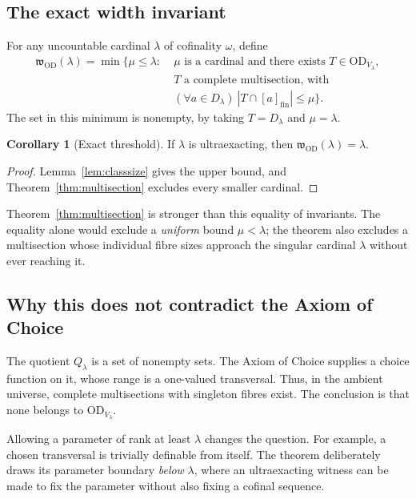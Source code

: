 \documentclass[11pt,letterpaper]{article}
\theoremstyle{definition}
\newtheorem{corollary}[definition]{Corollary}
\numberwithin{equation}{section}
\newcommand{\OD}{\mathrm{OD}}
\newcommand{\cl}[1]{[#1]_{\mathrm{fin}}}
\newcommand{\wOD}{\mathfrak w_{\OD}}
\begin{document}
\subsection{The exact width invariant}

For any uncountable cardinal $\lambda$ of cofinality $\omega$, define
\begin{equation}\label{eq:width}
\begin{split}
 \wOD(\lambda)=\min\bigl\{\mu\le\lambda:\;&\mu\text{ is a cardinal and there exists }T\in\OD_{V_\lambda},\\
 &T\text{ a complete multisection, with }\\
 &(\forall a\in D_\lambda)\ |T\cap\cl a|\le\mu\bigr\}.
\end{split}
\end{equation}
The set in this minimum is nonempty, by taking $T=D_\lambda$ and $\mu=\lambda$.

\begin{corollary}[Exact threshold]\label{cor:width}
If $\lambda$ is ultraexacting, then $\wOD(\lambda)=\lambda$.
\end{corollary}

\begin{proof}
Lemma~\ref{lem:classsize} gives the upper bound, and Theorem~\ref{thm:multisection} excludes every smaller cardinal.
\end{proof}

Theorem~\ref{thm:multisection} is stronger than this equality of invariants. The equality alone would exclude a \emph{uniform} bound $\mu<\lambda$; the theorem also excludes a multisection whose individual fibre sizes approach the singular cardinal $\lambda$ without ever reaching it.

\subsection{Why this does not contradict the Axiom of Choice}

The quotient $Q_\lambda$ is a set of nonempty sets. The Axiom of Choice supplies a choice function on it, whose range is a one-valued transversal. Thus, in the ambient universe, complete multisections with singleton fibres exist. The conclusion is that none belongs to $\OD_{V_\lambda}$.

Allowing a parameter of rank at least $\lambda$ changes the question. For example, a chosen transversal is trivially definable from itself. The theorem deliberately draws its parameter boundary \emph{below} $\lambda$, where an ultraexacting witness can be made to fix the parameter without also fixing a cofinal sequence.
\end{document}
